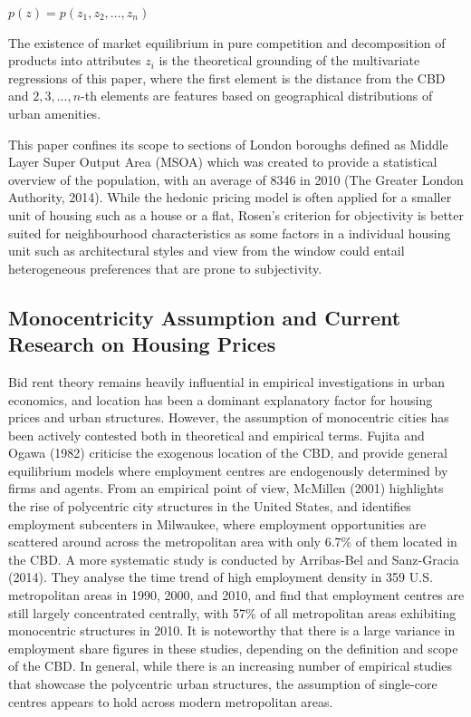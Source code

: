 \documentclass{article}
\begin{document}
\begin{center}
    $p ( z ) = p \left( z _ { 1 } , z _ { 2 } , \dots , z _ { n } \right)$
\end{center}

The existence of market equilibrium in pure competition and decomposition of products into attributes $z_i$ is the theoretical grounding of the multivariate regressions of this paper, where the first element is the distance from the CBD and $2, 3, ..., n$-th elements are features based on geographical distributions of urban amenities.

This paper confines its scope to sections of London boroughs defined as Middle Layer Super Output Area (MSOA) which was created to provide a statistical overview of the population, with an average of 8346 in 2010 (The Greater London Authority, 2014). While the hedonic pricing model is often applied for a smaller unit of housing such as a house or a flat, Rosen's criterion for objectivity is better suited for neighbourhood characteristics as some factors in a individual housing unit such as architectural styles and view from the window could entail heterogeneous preferences that are prone to subjectivity.

\subsection{Monocentricity Assumption and Current Research on Housing Prices}
Bid rent theory remains heavily influential in empirical investigations in urban economics, and location has been a dominant explanatory factor for housing prices and urban structures. However, the assumption of monocentric cities has been actively contested both in theoretical and empirical terms. Fujita and Ogawa (1982) criticise the exogenous location of the CBD, and provide general equilibrium models where employment centres are endogenously determined by firms and agents.
From an empirical point of view, McMillen (2001) highlights the rise of polycentric city structures in the United States, and identifies employment subcenters in Milwaukee, where employment opportunities are scattered around across the metropolitan area with only 6.7\% of them located in the CBD. A more systematic study is conducted by Arribas-Bel and Sanz-Gracia (2014). They analyse the time trend of high employment density in 359 U.S. metropolitan areas in 1990, 2000, and 2010, and find that employment centres are still largely concentrated centrally, with 57\% of all metropolitan areas exhibiting monocentric structures in 2010. It is noteworthy that there is a large variance in employment share figures in these studies, depending on the definition and scope of the CBD. In general, while there is an increasing number of empirical studies that showcase the polycentric urban structures, the assumption of single-core centres appears to hold across modern metropolitan areas. 
\end{document}
